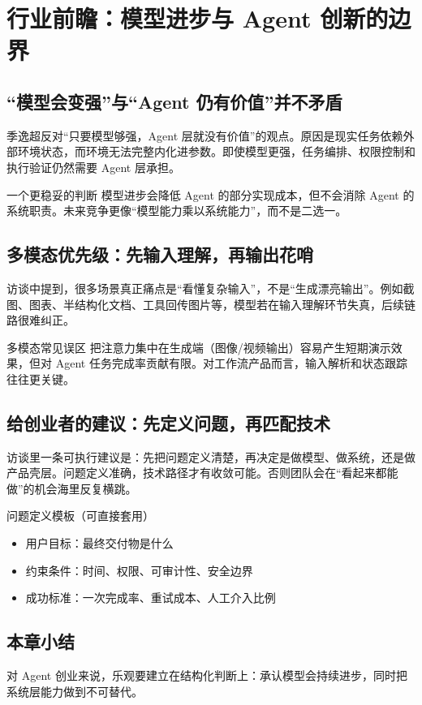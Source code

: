\section{行业前瞻：模型进步与 Agent 创新的边界}

\subsection{“模型会变强”与“Agent 仍有价值”并不矛盾}

季逸超反对“只要模型够强，Agent 层就没有价值”的观点。原因是现实任务依赖外部环境状态，而环境无法完整内化进参数。即使模型更强，任务编排、权限控制和执行验证仍然需要 Agent 层承担。

\begin{importantbox}{一个更稳妥的判断}
模型进步会降低 Agent 的部分实现成本，但不会消除 Agent 的系统职责。未来竞争更像“模型能力乘以系统能力”，而不是二选一。
\end{importantbox}

\subsection{多模态优先级：先输入理解，再输出花哨}

访谈中提到，很多场景真正痛点是“看懂复杂输入”，不是“生成漂亮输出”。例如截图、图表、半结构化文档、工具回传图片等，模型若在输入理解环节失真，后续链路很难纠正。

\begin{warningbox}{多模态常见误区}
把注意力集中在生成端（图像/视频输出）容易产生短期演示效果，但对 Agent 任务完成率贡献有限。对工作流产品而言，输入解析和状态跟踪往往更关键。
\end{warningbox}

\subsection{给创业者的建议：先定义问题，再匹配技术}

访谈里一条可执行建议是：先把问题定义清楚，再决定是做模型、做系统，还是做产品壳层。问题定义准确，技术路径才有收敛可能。否则团队会在“看起来都能做”的机会海里反复横跳。

\begin{knowledgebox}{问题定义模板（可直接套用）}
\begin{itemize}
    \item 用户目标：最终交付物是什么
    \item 约束条件：时间、权限、可审计性、安全边界
    \item 成功标准：一次完成率、重试成本、人工介入比例
\end{itemize}
\end{knowledgebox}

\subsection{本章小结}

对 Agent 创业来说，乐观要建立在结构化判断上：承认模型会持续进步，同时把系统层能力做到不可替代。


